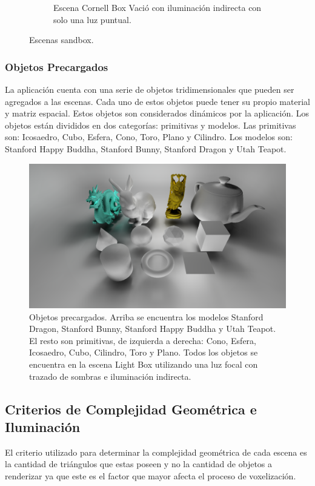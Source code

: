 \begin{figure}[H]
\begin{subfigure}[t]{0.32\textwidth}
		\caption*{Escena Cornell Box Vació con iluminación indirecta con solo una luz puntual.}
	\end{subfigure}
	\caption{Escenas sandbox.}
	\label{fig:sandboxscenes}
\end{figure}

\subsubsection{Objetos Precargados}
La aplicación cuenta con una serie de objetos tridimensionales que pueden ser agregados a las escenas. Cada uno de estos objetos puede tener su propio material y matriz espacial. Estos objetos son considerados dinámicos por la aplicación. Los objetos están divididos en dos categorías: primitivas y modelos. Las primitivas son: Icosaedro, Cubo, Esfera, Cono, Toro, Plano y Cilindro. Los modelos son: Stanford Happy Buddha, Stanford Bunny, Stanford Dragon y Utah Teapot.

\begin{figure}[H]
	\centering
	\includegraphics[width=0.95\linewidth]{media/scenes/models.png}
	\caption{Objetos precargados. Arriba se encuentra los modelos Stanford Dragon, Stanford Bunny, Stanford Happy Buddha y Utah Teapot. El resto son primitivas, de izquierda a derecha: Cono, Esfera, Icosaedro, Cubo, Cilindro, Toro y Plano. Todos los objetos se encuentra en la escena Light Box utilizando una luz focal con trazado de sombras e iluminación indirecta.}
	\label{fig:models}
\end{figure}

\subsection{Criterios de Complejidad Geométrica e Iluminación}

El criterio utilizado para determinar la complejidad geométrica de cada escena es la cantidad de triángulos que estas poseen y no la cantidad de objetos a renderizar ya que este es el factor que mayor afecta el proceso de voxelización. 

